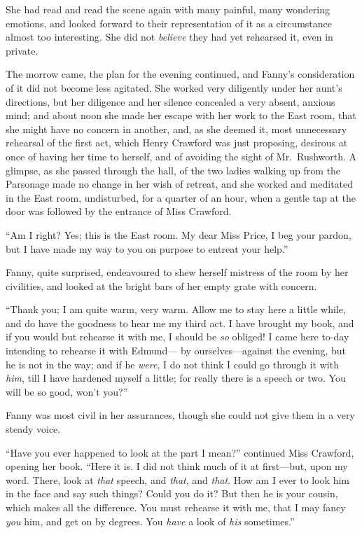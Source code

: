 \documentclass{article}
\begin{document}
She had read and read the scene again with many painful,
many wondering emotions, and looked forward to their
representation of it as a circumstance almost too interesting.
She did not \emph{believe} they had yet rehearsed it,
even in private.

The morrow came, the plan for the evening continued,
and Fanny's consideration of it did not become less agitated.
She worked very diligently under her aunt's directions,
but her diligence and her silence concealed a very absent,
anxious mind; and about noon she made her escape with her
work to the East room, that she might have no concern
in another, and, as she deemed it, most unnecessary
rehearsal of the first act, which Henry Crawford was
just proposing, desirous at once of having her time
to herself, and of avoiding the sight of Mr.\ Rushworth.
A glimpse, as she passed through the hall, of the two
ladies walking up from the Parsonage made no change
in her wish of retreat, and she worked and meditated
in the East room, undisturbed, for a quarter of an hour,
when a gentle tap at the door was followed by the entrance
of Miss Crawford.

``Am I right?  Yes; this is the East room.  My dear
Miss Price, I beg your pardon, but I have made my way
to you on purpose to entreat your help.''

Fanny, quite surprised, endeavoured to shew herself
mistress of the room by her civilities, and looked
at the bright bars of her empty grate with concern.

``Thank you; I am quite warm, very warm.  Allow me to stay
here a little while, and do have the goodness to hear me
my third act.  I have brought my book, and if you would
but rehearse it with me, I should be \emph{so} obliged!
I came here to-day intending to rehearse it with Edmund---%
by ourselves---against the evening, but he is not in the way;
and if he \emph{were}, I do not think I could go through
it with \emph{him}, till I have hardened myself a little;
for really there is a speech or two.  You will be so good,
won't you?''

Fanny was most civil in her assurances, though she could
not give them in a very steady voice.

``Have you ever happened to look at the part I mean?''
continued Miss Crawford, opening her book.  ``Here it is.
I did not think much of it at first---but, upon my word.
There, look at \emph{that} speech, and \emph{that}, and \emph{that}.
How am I ever to look him in the face and say such things?
Could you do it?  But then he is your cousin, which makes
all the difference.  You must rehearse it with me, that I
may fancy \emph{you} him, and get on by degrees.  You \emph{have} a look
of \emph{his} sometimes.''
\end{document}
